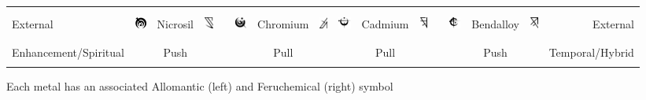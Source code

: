 \documentclass[conference]{IEEEtran}
\begin{document}
\begin{table}[!hb]
\begin{tabular}{ |l |ccc c ccc | ccc c ccc | r| }
		&&&&&&&&&&&&&&&\\&&&&&&&&&&&&&&&\\
		External&\includegraphics[height=1em]{images/Nicrosil.png} &Nicrosil& \includegraphics[height=1em]{images/Nicrosil_(Feruchemy).png}&&\includegraphics[height=1em]{images/Chromium.png}& Chromium& \includegraphics[height=1em]{images/Chromium_(Feruchemy).png}&\includegraphics[height=1em]{images/Cadmium.png} &Cadmium& \includegraphics[height=1em]{images/Cadmium_(Feruchemy).png}&&\includegraphics[height=1em]{images/Bendalloy.png}& Bendalloy& \includegraphics[height=1em]{images/Bendalloy_(Feruchemy).png}&External\\
		&&&&&&&&&&&&&&&\\\hline&&&&&&&&&&&&&&&\\
		Enhancement/Spiritual&&Push&&&&Pull&&&Pull&&&&Push&&Temporal/Hybrid\\&&&&&&&&&&&&&&&\\\hline
	\end{tabular}
\vspace{0.5em}\break
Each metal has an associated Allomantic\cite{AL-TB} (left) and Feruchemical\cite{FE-TB} (right) symbol
	\label{metals}
\end{table}
\newpage
\end{document}
